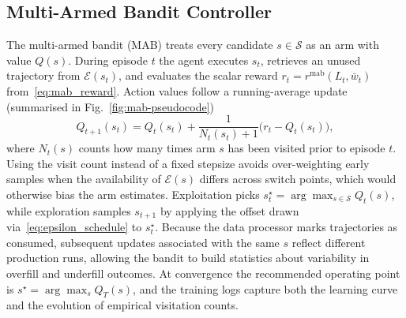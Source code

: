 \documentclass[journal]{IEEEtranTIE}
\begin{document}
\subsection{Multi-Armed Bandit Controller}
The multi-armed bandit (MAB) treats every candidate $s\in\mathcal{S}$ as an arm with value $Q(s)$. During episode $t$ the agent executes $s_t$, retrieves an unused trajectory from $\mathcal{E}(s_t)$, and evaluates the scalar reward $r_t=r^{\mathrm{mab}}(L_t,\bar{w}_t)$ from~\eqref{eq:mab_reward}. Action values follow a running-average update (summarised in Fig.~\ref{fig:mab-pseudocode})
\begin{equation}
  Q_{t+1}(s_t) = Q_t(s_t) + \frac{1}{N_t(s_t)+1}\bigl(r_t - Q_t(s_t)\bigr),
  \label{eq:mab_update}
\end{equation}
where $N_t(s)$ counts how many times arm $s$ has been visited prior to episode $t$. Using the visit count instead of a fixed stepsize avoids over-weighting early samples when the availability of $\mathcal{E}(s)$ differs across switch points, which would otherwise bias the arm estimates. Exploitation picks $s^\star_t = \arg\max_{s\in\mathcal{S}} Q_t(s)$, while exploration samples $s_{t+1}$ by applying the offset drawn via~\eqref{eq:epsilon_schedule} to $s^\star_t$. Because the data processor marks trajectories as consumed, subsequent updates associated with the same $s$ reflect different production runs, allowing the bandit to build statistics about variability in overfill and underfill outcomes. At convergence the recommended operating point is $s^\star = \arg\max_s Q_T(s)$, and the training logs capture both the learning curve and the evolution of empirical visitation counts.
\end{document}
